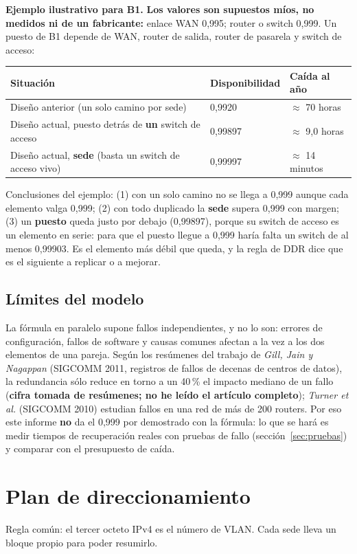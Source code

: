 \documentclass[11pt,a4paper]{article}
\begin{document}
\textbf{Ejemplo ilustrativo para B1.} \textbf{Los valores son supuestos míos, no medidos ni de un fabricante:} enlace WAN 0,995; router o switch 0,999. Un puesto de B1 depende de WAN, router de salida, router de pasarela y switch de acceso:
\begin{center}
\begin{tabular}{@{}p{7.7cm}p{3.1cm}p{3.5cm}@{}}
\toprule
\textbf{Situación} & \textbf{Disponibilidad} & \textbf{Caída al año}\\
\midrule
Diseño anterior (un solo camino por sede) & 0,9920 & $\approx$ 70 horas\\
Diseño actual, puesto detrás de \textbf{un} switch de acceso & 0,99897 & $\approx$ 9,0 horas\\
Diseño actual, \textbf{sede} (basta un switch de acceso vivo) & 0,99997 & $\approx$ 14 minutos\\
\bottomrule
\end{tabular}
\end{center}
Conclusiones del ejemplo: (1) con un solo camino no se llega a 0,999 aunque cada elemento valga 0,999; (2) con todo duplicado la \textbf{sede} supera 0,999 con margen; (3) un \textbf{puesto} queda justo por debajo (0,99897), porque su switch de acceso es un elemento en serie: para que el puesto llegue a 0,999 haría falta un switch de al menos 0,99903. Es el elemento más débil que queda, y la regla de DDR dice que es el siguiente a replicar o a mejorar.

\subsection{Límites del modelo}
La fórmula en paralelo supone fallos independientes, y no lo son: errores de configuración, fallos de software y causas comunes afectan a la vez a los dos elementos de una pareja. Según los resúmenes del trabajo de \textit{Gill, Jain y Nagappan} (SIGCOMM 2011, registros de fallos de decenas de centros de datos), la redundancia sólo reduce en torno a un 40\,\% el impacto mediano de un fallo (\textbf{cifra tomada de resúmenes; no he leído el artículo completo}); \textit{Turner et al.} (SIGCOMM 2010) estudian fallos en una red de más de 200 routers. Por eso este informe \textbf{no} da el 0,999 por demostrado con la fórmula: lo que se hará es medir tiempos de recuperación reales con pruebas de fallo (sección~\ref{sec:pruebas}) y comparar con el presupuesto de caída.

\section{Plan de direccionamiento}
Regla común: el tercer octeto IPv4 es el número de VLAN. Cada sede lleva un bloque propio para poder resumirlo.
\end{document}
